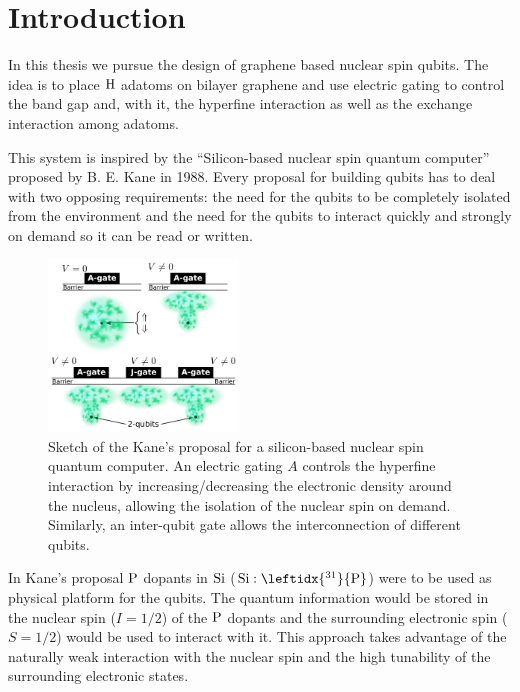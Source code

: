 \chapter{Introduction}
\label{ch:introduction}
\bigskip

In this thesis we pursue the design of graphene based nuclear spin qubits.
The idea is to place $\ce{H}$ adatoms on bilayer graphene and use electric gating to control the band gap and, with it, the hyperfine interaction as well as the exchange interaction among adatoms.
\smallskip

This system is inspired by the ``Silicon-based nuclear spin quantum computer'' proposed by B. E. Kane\cite{Kane1988} in 1988.
Every proposal for building qubits has to deal with two opposing requirements: the need for the qubits to be completely isolated from the environment and the need for the qubits to interact quickly and strongly on demand so it can be read or written.
\begin{figure}
\centering
\vspace{-10pt}
\includegraphics[width=0.45\textwidth]{introduction/figures/kane.pdf}
\vspace{-7pt}
\caption{Sketch of the Kane's proposal for a silicon-based nuclear spin quantum computer. An electric gating $A$ controls the hyperfine interaction by increasing/decreasing the electronic density around the nucleus, allowing the isolation of the nuclear spin on demand. Similarly, an inter-qubit gate allows the interconnection of different qubits.}
\label{kane_proposal}
\end{figure}
\FloatBarrier
In Kane's proposal $\ce{P}$ dopants in $\ce{Si}$ ($\ce{Si}:\leftidx{^{31}}{\ce{P}}$) were to be used as physical platform for the qubits. The quantum information would be stored in the nuclear spin ($I=1/2$) of the $\ce{P}$ dopants and the surrounding electronic spin ($S=1/2$) would be used to interact with it. This approach takes advantage of the naturally weak interaction with the nuclear spin and the high tunability of the surrounding electronic states.

